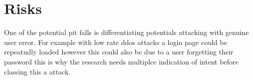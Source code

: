\section{Risks}
One of the potential pit falls is differentiating potentials attacking with genuine user error. For example with low rate ddos attacks a login page could be repeatudly loaded however this could also be due to a user forgetting their password this is why the research needs multiplce indication of intent before classing this a attack.  